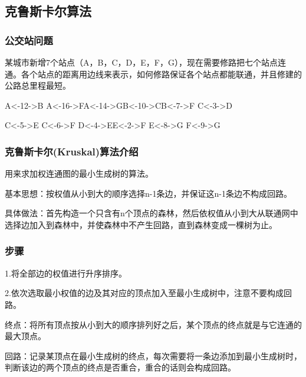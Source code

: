 \documentclass[a4paper]{report}
\begin{document}
\subsection{克鲁斯卡尔算法}
\subsubsection{公交站问题}
某城市新增7个站点（A，B，C，D，E，F，G），现在需要修路把七个站点连通。各个站点的距离用边线来表示，如何修路保证各个站点都能联通，并且修建的公路总里程最短。

\hphantom{~}\hfill A<-12->B \hfill A<-16->F\hfill A<-14->G\hfill B<-10->C\hfill B<-7->F \hfill C<-3->D \hfill\hphantom{~}

\hphantom{~}\hfill C<-5->E \hfill C<-6->F \hfill D<-4->E\hfill E<-2->F 
 \hfill E<-8->G \hfill F<-9->G \hfill\hphantom{~}

\subsubsection{克鲁斯卡尔(Kruskal)算法介绍}
用来求加权连通图的最小生成树的算法。

基本思想：按权值从小到大的顺序选择n-1条边，并保证这n-1条边不构成回路。

具体做法：首先构造一个只含有n个顶点的森林，然后依权值从小到大从联通网中选择边加入到森林中，并使森林中不产生回路，直到森林变成一棵树为止。
\subsubsection{步骤}
1.将全部边的权值进行升序排序。

2.依次选取最小权值的边及其对应的顶点加入至最小生成树中，注意不要构成回路。

终点：将所有顶点按从小到大的顺序排列好之后，某个顶点的终点就是与它连通的最大顶点。

回路：记录某顶点在最小生成树的终点，每次需要将一条边添加到最小生成树时，判断该边的两个顶点的终点是否重合，重合的话则会构成回路。
\end{document}
